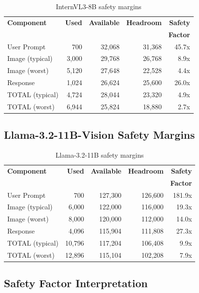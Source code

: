 \documentclass[11pt,a4paper]{article}
\begin{document}
\begin{table}[h]
\centering
\small
\begin{tabular}{lrrrr}
\toprule
\textbf{Component} & \textbf{Used} & \textbf{Available} & \textbf{Headroom} & \textbf{Safety} \\
& & & & \textbf{Factor} \\
\midrule
User Prompt & 700 & 32,068 & 31,368 & 45.7x \\
Image (typical) & 3,000 & 29,768 & 26,768 & 8.9x \\
Image (worst) & 5,120 & 27,648 & 22,528 & 4.4x \\
Response & 1,024 & 26,624 & 25,600 & 26.0x \\
\midrule
TOTAL (typical) & 4,724 & 28,044 & 23,320 & 4.9x \\
TOTAL (worst) & 6,944 & 25,824 & 18,880 & 2.7x \\
\bottomrule
\end{tabular}
\caption{InternVL3-8B safety margins}
\end{table}

\subsection{Llama-3.2-11B-Vision Safety Margins}

\begin{table}[h]
\centering
\small
\begin{tabular}{lrrrr}
\toprule
\textbf{Component} & \textbf{Used} & \textbf{Available} & \textbf{Headroom} & \textbf{Safety} \\
& & & & \textbf{Factor} \\
\midrule
User Prompt & 700 & 127,300 & 126,600 & 181.9x \\
Image (typical) & 6,000 & 122,000 & 116,000 & 19.3x \\
Image (worst) & 8,000 & 120,000 & 112,000 & 14.0x \\
Response & 4,096 & 115,904 & 111,808 & 27.3x \\
\midrule
TOTAL (typical) & 10,796 & 117,204 & 106,408 & 9.9x \\
TOTAL (worst) & 12,896 & 115,104 & 102,208 & 7.9x \\
\bottomrule
\end{tabular}
\caption{Llama-3.2-11B safety margins}
\end{table}

\subsection{Safety Factor Interpretation}
\end{document}
